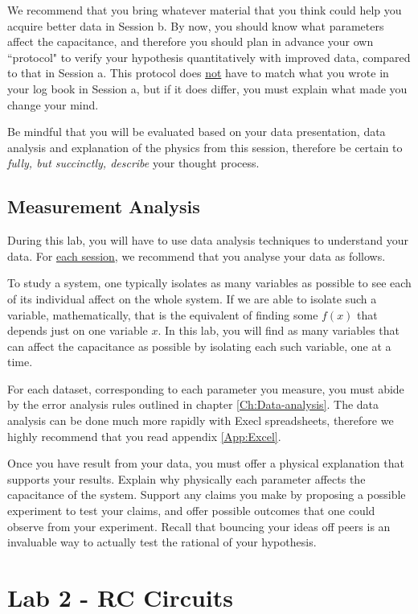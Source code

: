 \documentclass[12pt]{report}
\begin{document}
We recommend that you bring whatever material that you think could help you acquire better data in Session b. 
By now, you should know what parameters affect the capacitance, and therefore you should plan in advance your own ``protocol" to verify your hypothesis quantitatively with improved data, compared to that in Session a. 
This protocol does \underline{not} have to match what you wrote in your log book in Session a, but if it does differ, you must explain what made you change your mind.

{\color{blue}Be mindful that you will be evaluated based on your data presentation, data analysis and explanation of the physics from this session, therefore be certain to \textit{fully, but succinctly, describe} your thought process.} 

\section{Measurement Analysis}
\label{Sec:lab1-analysis}
During this lab, you will have to use data analysis techniques to understand your data. For \underline{each session}, we recommend that you analyse your data as follows.

To study a system, one typically isolates as many variables as possible to see each of its individual affect on the whole system. If we are able to isolate such a variable, mathematically, that is the equivalent of finding some $f(x)$ that depends just on one variable $x$. In this lab, you will find as many variables that can affect the capacitance as possible by isolating each such variable, one at a time.

For each dataset, corresponding to each parameter you measure, you must abide by the error analysis rules outlined in chapter \ref{Ch:Data-analysis}. 
The data analysis can be done much more rapidly with Execl spreadsheets, therefore we highly recommend that you read appendix \ref{App:Excel}. 

Once you have  result from your data, you must offer a physical explanation that supports your results. {\color{blue} Explain why physically each parameter affects the capacitance of the system. Support any claims you make by proposing a possible experiment to test your claims, and offer possible outcomes that one could observe from your experiment.} Recall that bouncing your ideas off peers is an invaluable way to actually test the rational of your hypothesis.


\chapter{Lab 2 - RC Circuits}
\end{document}
